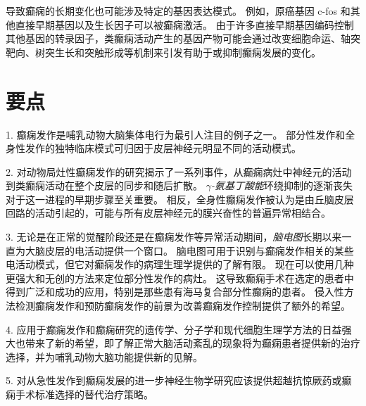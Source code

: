 导致癫痫的长期变化也可能涉及特定的基因表达模式。
例如，原癌基因 c-fos 和其他直接早期基因以及生长因子可以被癫痫激活。
由于许多直接早期基因编码控制其他基因的转录因子，类癫痫活动产生的基因产物可能会通过改变细胞命运、轴突靶向、树突生长和突触形成等机制来引发有助于或抑制癫痫发展的变化。



\section{要点}

1. 癫痫发作是哺乳动物大脑集体电行为最引人注目的例子之一。
部分性发作和全身性发作的独特临床模式可归因于皮层神经元明显不同的活动模式。


2. 对动物局灶性癫痫发作的研究揭示了一系列事件，从癫痫病灶中神经元的活动到类癫痫活动在整个皮层的同步和随后扩散。
\textit{$\gamma$-氨基丁酸能}环绕抑制的逐渐丧失对于这一进程的早期步骤至关重要。
相反，全身性癫痫发作被认为是由丘脑皮层回路的活动引起的，可能与所有皮层神经元的膜兴奋性的普遍异常相结合。


3. 无论是在正常的觉醒阶段还是在癫痫发作等异常活动期间，\textit{脑电图}长期以来一直为大脑皮层的电活动提供一个窗口。
脑电图可用于识别与癫痫发作相关的某些电活动模式，但它对癫痫发作的病理生理学提供的了解有限。
现在可以使用几种更强大和无创的方法来定位部分性发作的病灶。
这导致癫痫手术在选定的患者中得到广泛和成功的应用，特别是那些患有海马复合部分性癫痫的患者。
侵入性方法检测癫痫发作和预防癫痫发作的前景为改善癫痫发作控制提供了额外的希望。


4. 应用于癫痫发作和癫痫研究的遗传学、分子学和现代细胞生理学方法的日益强大也带来了新的希望，即了解正常大脑活动紊乱的现象将为癫痫患者提供新的治疗选择，并为哺乳动物大脑功能提供新的见解。


5. 对从急性发作到癫痫发展的进一步神经生物学研究应该提供超越抗惊厥药或癫痫手术标准选择的替代治疗策略。
